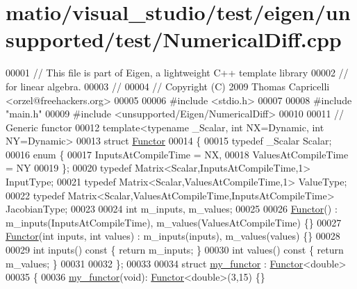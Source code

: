 \hypertarget{matio_2visual__studio_2test_2eigen_2unsupported_2test_2_numerical_diff_8cpp_source}{}\section{matio/visual\+\_\+studio/test/eigen/unsupported/test/\+Numerical\+Diff.cpp}
\label{matio_2visual__studio_2test_2eigen_2unsupported_2test_2_numerical_diff_8cpp_source}

\begin{DoxyCode}
00001 \textcolor{comment}{// This file is part of Eigen, a lightweight C++ template library}
00002 \textcolor{comment}{// for linear algebra.}
00003 \textcolor{comment}{//}
00004 \textcolor{comment}{// Copyright (C) 2009 Thomas Capricelli <orzel@freehackers.org>}
00005 
00006 \textcolor{preprocessor}{#include <stdio.h>}
00007 
00008 \textcolor{preprocessor}{#include "main.h"}
00009 \textcolor{preprocessor}{#include <unsupported/Eigen/NumericalDiff>}
00010     
00011 \textcolor{comment}{// Generic functor}
00012 \textcolor{keyword}{template}<\textcolor{keyword}{typename} \_Scalar, \textcolor{keywordtype}{int} NX=Dynamic, \textcolor{keywordtype}{int} NY=Dynamic>
00013 \textcolor{keyword}{struct }\hyperlink{struct_functor}{Functor}
00014 \{
00015   \textcolor{keyword}{typedef} \_Scalar Scalar;
00016   \textcolor{keyword}{enum} \{
00017     InputsAtCompileTime = NX,
00018     ValuesAtCompileTime = NY
00019   \};
00020   \textcolor{keyword}{typedef} Matrix<Scalar,InputsAtCompileTime,1> InputType;
00021   \textcolor{keyword}{typedef} Matrix<Scalar,ValuesAtCompileTime,1> ValueType;
00022   \textcolor{keyword}{typedef} Matrix<Scalar,ValuesAtCompileTime,InputsAtCompileTime> JacobianType;
00023   
00024   \textcolor{keywordtype}{int} m\_inputs, m\_values;
00025   
00026   \hyperlink{struct_functor}{Functor}() : m\_inputs(InputsAtCompileTime), m\_values(ValuesAtCompileTime) \{\}
00027   \hyperlink{struct_functor}{Functor}(\textcolor{keywordtype}{int} inputs, \textcolor{keywordtype}{int} values) : m\_inputs(inputs), m\_values(values) \{\}
00028   
00029   \textcolor{keywordtype}{int} inputs()\textcolor{keyword}{ const }\{ \textcolor{keywordflow}{return} m\_inputs; \}
00030   \textcolor{keywordtype}{int} values()\textcolor{keyword}{ const }\{ \textcolor{keywordflow}{return} m\_values; \}
00031 
00032 \};
00033 
00034 \textcolor{keyword}{struct }\hyperlink{structmy__functor}{my\_functor} : \hyperlink{struct_functor}{Functor}<double>
00035 \{
00036     \hyperlink{structmy__functor}{my\_functor}(\textcolor{keywordtype}{void}): \hyperlink{struct_functor}{Functor}<double>(3,15) \{\}

\end{DoxyCode}
